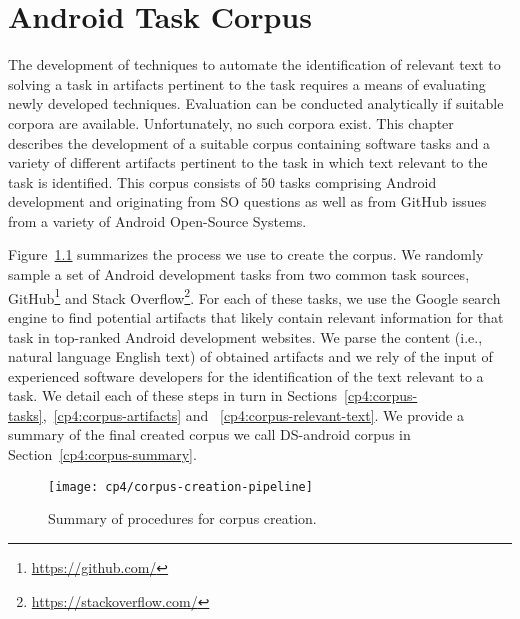 \setcounter{chapter}{3}
\setcounter{rq}{1}


\chapter{Android Task Corpus}
\label{ch:android-corpus}





The development of techniques
to automate the identification of relevant text
to solving a task in artifacts
pertinent to the task requires a
means of evaluating newly developed
techniques. Evaluation can be conducted
analytically if suitable corpora are
available. Unfortunately, no such corpora
exist. This chapter describes the
development of a suitable corpus
containing
software tasks
and a variety of different artifacts pertinent
to the task in which text relevant to the
task is identified.
This corpus consists of 
50 tasks comprising Android development and originating from \acf{SO} questions
as well as from GitHub issues from a variety of Android Open-Source Systems.

Figure~\ref{fig:corpus-creation-pipeline}
summarizes the process we use to create the corpus.
We randomly sample a set of Android development tasks from two common
task sources, GitHub\footnote{\url{https://github.com/}} and Stack Overflow\footnote{\url{https://stackoverflow.com/}}.
For each of these tasks, we use the Google search engine to find potential artifacts that likely contain relevant
information for that task in top-ranked Android development websites. 
We parse the content (i.e., natural language English text) of obtained artifacts 
and we rely of the input of experienced 
software developers for the identification of the text relevant to a task.
We detail each of these steps in turn in 
Sections~\ref{cp4:corpus-tasks},~\ref{cp4:corpus-artifacts} and ~\ref{cp4:corpus-relevant-text}.
We provide a summary of the final created corpus we call \acs{DS-android} corpus in Section~\ref{cp4:corpus-summary}.



\begin{figure}
    \centering
    \texttt{[image: cp4/corpus-creation-pipeline]}
    \caption{Summary of procedures for corpus creation.}
    \label{fig:corpus-creation-pipeline}
\end{figure}















